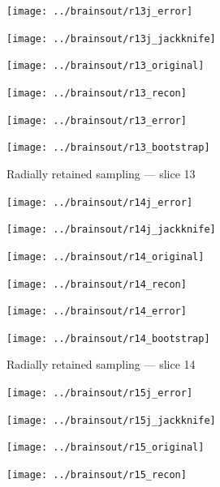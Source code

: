 \documentclass[article]{jdssv}
\begin{document}
\begin{appendix}
\begin{figure}
\begin{centering}
\parbox{\imsize}{\texttt{[image: ../brainsout/r13j\_error]}}
\parbox{\imsize}{\texttt{[image: ../brainsout/r13j\_jackknife]}}

\vspace{\vertsep}

\parbox{\imsize}{\texttt{[image: ../brainsout/r13\_original]}}
\parbox{\imsize}{\texttt{[image: ../brainsout/r13\_recon]}}

\vspace{\vertsep}

\parbox{\imsize}{\texttt{[image: ../brainsout/r13\_error]}}
\parbox{\imsize}{\texttt{[image: ../brainsout/r13\_bootstrap]}}

\end{centering}
\caption{Radially retained sampling --- slice 13}
\end{figure}


\begin{figure}
\begin{centering}

\parbox{\imsize}{\texttt{[image: ../brainsout/r14j\_error]}}
\parbox{\imsize}{\texttt{[image: ../brainsout/r14j\_jackknife]}}

\vspace{\vertsep}

\parbox{\imsize}{\texttt{[image: ../brainsout/r14\_original]}}
\parbox{\imsize}{\texttt{[image: ../brainsout/r14\_recon]}}

\vspace{\vertsep}

\parbox{\imsize}{\texttt{[image: ../brainsout/r14\_error]}}
\parbox{\imsize}{\texttt{[image: ../brainsout/r14\_bootstrap]}}

\end{centering}
\caption{Radially retained sampling --- slice 14}
\end{figure}


\begin{figure}
\begin{centering}

\parbox{\imsize}{\texttt{[image: ../brainsout/r15j\_error]}}
\parbox{\imsize}{\texttt{[image: ../brainsout/r15j\_jackknife]}}

\vspace{\vertsep}

\parbox{\imsize}{\texttt{[image: ../brainsout/r15\_original]}}
\parbox{\imsize}{\texttt{[image: ../brainsout/r15\_recon]}}

\vspace{\vertsep}


\end{centering}
\end{figure}
\end{appendix}
\end{document}
